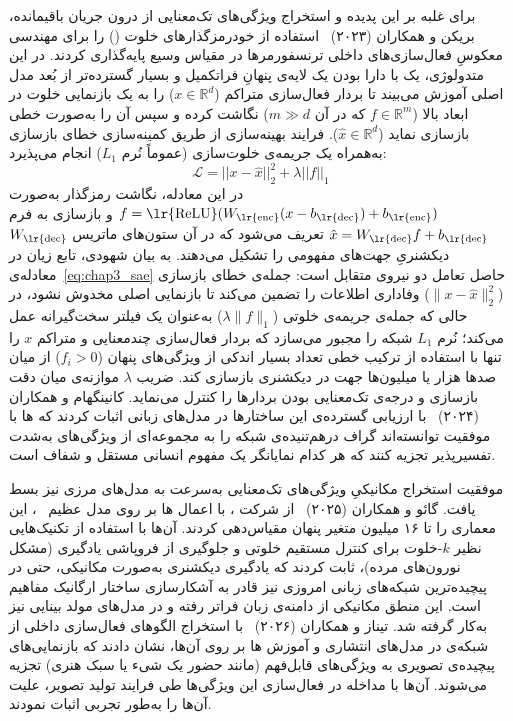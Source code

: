 برای غلبه بر این پدیده و استخراج ویژگی‌های تک‌معنایی از درون جریان باقیمانده، بریکن و همکاران (۲۰۲۳)~\cite{bricken2023monosemanticity} استفاده از خودرمزگذارهای خلوت () را برای مهندسی معکوسِ فعال‌سازی‌های داخلی ترنسفورمرها در مقیاس وسیع پایه‌گذاری کردند. در این متدولوژی، یک  با دارا بودن یک لایه‌ی پنهانِ فراتکمیل و بسیار گسترده‌تر از بُعد مدل اصلی آموزش می‌بیند تا بردار فعال‌سازی متراکم ($x \in \mathbb{R}^d$) را به یک بازنمایی خلوت در ابعاد بالا ($f \in \mathbb{R}^m$ که در آن $m \gg d$) نگاشت کرده و سپس آن را به‌صورت خطی بازسازی نماید ($\hat{x} \in \mathbb{R}^d$). فرایند بهینه‌سازی از طریق کمینه‌سازی خطای بازسازی به‌همراه یک جریمه‌ی خلوت‌سازی (عموماً نُرم $L_1$) انجام می‌پذیرد:
\begin{equation}\label{eq:chap3_sae}
    \mathcal{L} = ||x - \hat{x}||_2^2 + \lambda ||f||_1
\end{equation}
در این معادله، نگاشت رمزگذار به‌صورت $f = \text{\lr{ReLU}}(W_{\text{\lr{enc}}} (x - b_{\text{\lr{dec}}}) + b_{\text{\lr{enc}}})$ و بازسازی به فرم $\hat{x} = W_{\text{\lr{dec}}} f + b_{\text{\lr{dec}}}$ تعریف می‌شود که در آن ستون‌های ماتریس $W_{\text{\lr{dec}}}$ دیکشنریِ جهت‌های مفهومی را تشکیل می‌دهند. به بیان شهودی، تابع زیان در معادله‌ی~\ref{eq:chap3_sae} حاصل تعامل دو نیروی متقابل است: جمله‌ی خطای بازسازی ($\|x - \hat{x}\|_2^2$) وفاداری اطلاعات را تضمین می‌کند تا بازنمایی اصلی مخدوش نشود، در حالی که جمله‌ی جریمه‌ی خلوتی ($\lambda \|f\|_1$) به‌عنوان یک فیلتر سخت‌گیرانه عمل می‌کند؛ نُرم $L_1$ شبکه را مجبور می‌سازد که بردار فعال‌سازی چندمعنایی و متراکم $x$ را تنها با استفاده از ترکیب خطی تعداد بسیار اندکی از ویژگی‌های پنهان ($f_i > 0$) از میان صدها هزار یا میلیون‌ها جهت در دیکشنری بازسازی کند. ضریب $\lambda$ موازنه‌ی میان دقت بازسازی و درجه‌ی تک‌معنایی بودن بردارها را کنترل می‌نماید. کانینگهام و همکاران (۲۰۲۴)~\cite{huben2024sparse} با ارزیابی گسترده‌ی این ساختارها در مدل‌های زبانی اثبات کردند که ها با موفقیت توانسته‌اند گراف درهم‌تنیده‌ی شبکه را به مجموعه‌ای از ویژگی‌های به‌شدت تفسیرپذیر تجزیه کنند که هر کدام نمایانگر یک مفهوم انسانی مستقل و شفاف است. 

موفقیت استخراج مکانیکیِ ویژگی‌های تک‌معنایی به‌سرعت به مدل‌های مرزی نیز بسط یافت. گائو و همکاران (۲۰۲۵)~\cite{gao2025scaling} از شرکت ، با اعمال ها بر روی مدل عظیم ~\cite{openai2023gpt4}، این معماری را تا ۱۶ میلیون متغیر پنهان مقیاس‌دهی کردند. آن‌ها با استفاده از تکنیک‌هایی نظیر $k$-خلوت برای کنترل مستقیم خلوتی و جلوگیری از فروپاشی یادگیری (مشکل نورون‌های مرده)، ثابت کردند که یادگیری دیکشنری به‌صورت مکانیکی، حتی در پیچیده‌ترین شبکه‌های زبانی امروزی نیز قادر به آشکارسازی ساختار ارگانیک مفاهیم است. این منطق مکانیکی از دامنه‌ی زبان فراتر رفته و در مدل‌های مولد بینایی نیز به‌کار گرفته شد. تیناز و همکاران (۲۰۲۶)~\cite{tinaz2026emergence} با استخراج الگوهای فعال‌سازی داخلی از شبکه‌ی  در مدل‌های انتشاری و آموزش ها بر روی آن‌ها، نشان دادند که بازنمایی‌های پیچیده‌ی تصویری به ویژگی‌های قابل‌فهم (مانند حضور یک شیء یا سبک هنری) تجزیه می‌شوند. آن‌ها با مداخله در فعال‌سازی این ویژگی‌ها طی فرایند تولید تصویر، علیت آن‌ها را به‌طور تجربی اثبات نمودند.

